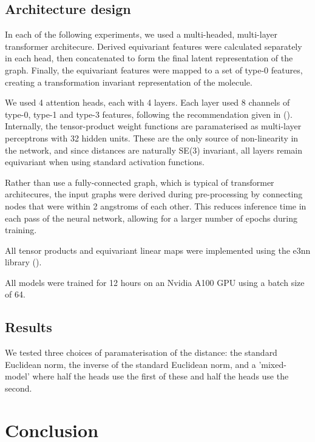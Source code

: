 \documentclass[11pt]{article}
\begin{document}


\subsection{Architecture design}

In each of the following experiments, we used a multi-headed, multi-layer transformer architecure. Derived equivariant features were calculated separately in each head, then concatenated to form the final latent representation of the graph. Finally, the equivariant features were mapped to a set of type-0 features, creating a transformation invariant representation of the molecule.

We used 4 attention heads, each with 4 layers. Each layer used 8 channels of type-0, type-1 and type-3 features, following the recommendation given in (\cite{rototranslational}). Internally, the tensor-product weight functions are paramaterised as multi-layer perceptrons with 32 hidden units. These are the only source of non-linearity in the network, and since distances are naturally SE(3) invariant, all layers remain equivariant when using standard activation functions.

Rather than use a fully-connected graph, which is typical of transformer architecures, the input graphs were derived during pre-processing by connecting nodes that were within 2 angstroms of each other. This reduces inference time in each pass of the neural network, allowing for a larger number of epochs during training.  

All tensor products and equivariant linear maps were implemented using the e3nn library (\cite{geiger2022e3nn}).

All models were trained for 12 hours on an Nvidia A100 GPU using a batch size of 64.

\subsection{Results}

We tested three choices of paramaterisation of the distance: the standard Euclidean norm, the inverse of the standard Euclidean norm, and a 'mixed-model' where half the heads use the first of these and half the heads use the second.

\section{Conclusion}
\end{document}
